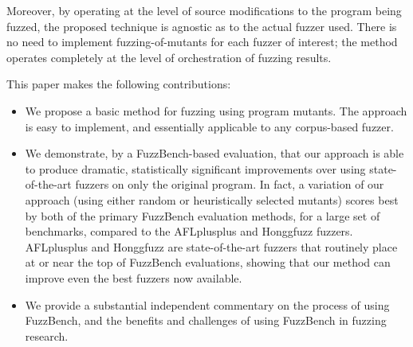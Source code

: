 Moreover, by operating at the level of source modifications to the program being fuzzed, the proposed technique is agnostic as to the actual fuzzer used.  There is no need to implement fuzzing-of-mutants for each fuzzer of interest; the method operates completely at the level of orchestration of fuzzing results.


This paper makes the following contributions:

\begin{itemize}
\item We propose a basic method for fuzzing using program mutants.
  The approach is easy to implement, and essentially applicable to any
  corpus-based fuzzer.
  \item We demonstrate, by a FuzzBench-based evaluation, that our
    approach is able to produce dramatic, statistically significant
    improvements over using state-of-the-art fuzzers on only the
    original program.  In fact, a variation of our approach (using
    either random or heuristically selected mutants) scores best by
    both of the primary FuzzBench evaluation methods, for a large set
    of benchmarks, compared to the AFLplusplus and Honggfuzz fuzzers.
    AFLplusplus and Honggfuzz are state-of-the-art fuzzers that
    routinely place at or near the top of FuzzBench evaluations,
    showing that our method can improve even  the best fuzzers now available.
    \item We provide a substantial independent commentary on the
      process of using FuzzBench, and the benefits and challenges of
      using FuzzBench in fuzzing research.
\end{itemize}